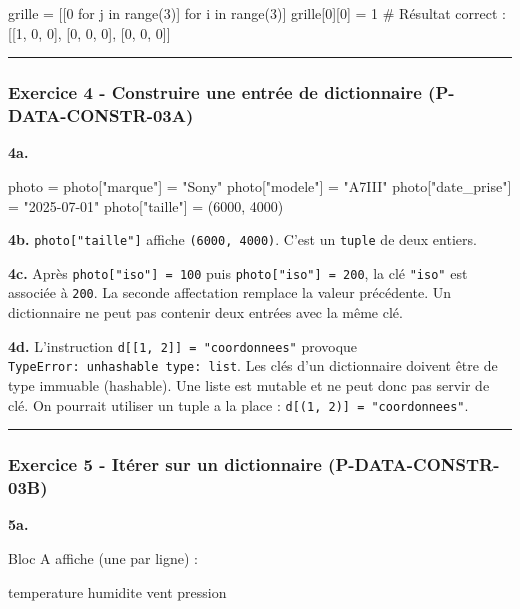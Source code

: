 \begin{python}
grille = [[0 for j in range(3)] for i in range(3)]
grille[0][0] = 1
# Résultat correct : [[1, 0, 0], [0, 0, 0], [0, 0, 0]]
\end{python}

\begin{center}\rule{0.5\linewidth}{0.5pt}\end{center}

\subsubsection{Exercice 4 - Construire une entrée de dictionnaire (P-DATA-CONSTR-03A)}

\textbf{4a.}

\begin{python}
photo = {}
photo["marque"] = "Sony"
photo["modele"] = "A7III"
photo["date_prise"] = "2025-07-01"
photo["taille"] = (6000, 4000)
\end{python}

\textbf{4b.} \texttt{photo{[}"taille"{]}} affiche
\texttt{(6000,\ 4000)}. C'est un \texttt{tuple} de deux entiers.

\textbf{4c.} Après \texttt{photo{[}"iso"{]}\ =\ 100} puis
\texttt{photo{[}"iso"{]}\ =\ 200}, la clé \texttt{"iso"} est associée à
\texttt{200}. La seconde affectation remplace la valeur précédente. Un
dictionnaire ne peut pas contenir deux entrées avec la même clé.

\textbf{4d.} L'instruction \texttt{d{[}{[}1,\ 2{]}{]}\ =\ "coordonnees"}
provoque
\texttt{TypeError:\ unhashable\ type:\ \textquotesingle{}list\textquotesingle{}}.
Les clés d'un dictionnaire doivent être de type immuable (hashable). Une
liste est mutable et ne peut donc pas servir de clé. On pourrait
utiliser un tuple a la place :
\texttt{d{[}(1,\ 2){]}\ =\ "coordonnees"}.

\begin{center}\rule{0.5\linewidth}{0.5pt}\end{center}

\subsubsection{Exercice 5 - Itérer sur un dictionnaire (P-DATA-CONSTR-03B)}

\textbf{5a.}

Bloc A affiche (une par ligne) :

\begin{python}
temperature
humidite
vent
pression
\end{python}

